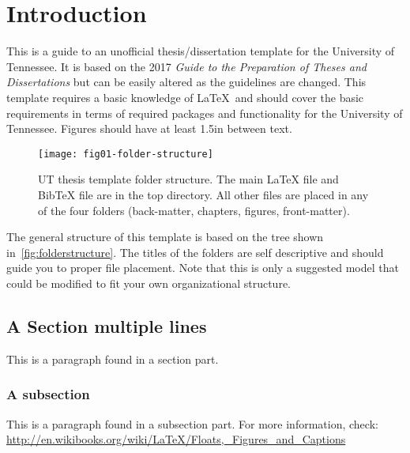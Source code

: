 \chapter{Introduction} \label{chapter1}

This is a guide to an unofficial thesis/dissertation template
for the University of Tennessee.
It is based on the 2017 \textit{Guide to the Preparation of Theses and Dissertations}
but can be easily altered as the guidelines are changed.
This template requires a basic knowledge of \LaTeX\ and should cover
the basic requirements in terms of required packages and functionality
for the University of Tennessee.
Figures should have at least 1.5in between text.

\begin{pagefloat}
\begin{figure}[H]
    \Centering
    \texttt{[image: fig01-folder-structure]}
    \caption[UT thesis template folder structure]{UT thesis template folder structure.
        The main LaTeX file and BibTeX file are in the top directory.
        All other files are placed in any of the four folders
        (back-matter, chapters, figures, front-matter).}
    \label{fig:folderstructure}
\end{figure}
\end{pagefloat}

The general structure of this template is based on the tree shown in~\autoref{fig:folderstructure}.
The titles of the folders are self descriptive
and should guide you to proper file placement.
Note that this is only a suggested model that could be
modified to fit your own organizational structure.

\section{A Section multiple lines} \label{asection}
This is a paragraph found in a section part.

\subsection{A subsection}
This is a paragraph found in a subsection part.
For more information, check:
\url{http://en.wikibooks.org/wiki/LaTeX/Floats,_Figures_and_Captions}

